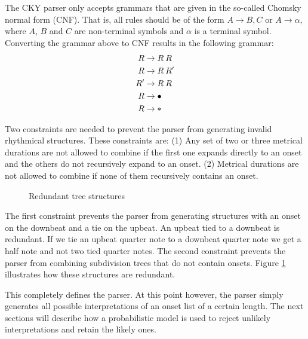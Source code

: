 The CKY parser only accepts grammars that are given in the so-called Chomsky normal form (CNF). That is, all rules should be of the form $A \rightarrow B, C$ or $A \rightarrow \alpha$, where $A$, $B$ and $C$ are non-terminal symbols and $\alpha$ is a terminal symbol. Converting the grammar above to CNF results in the following grammar:
\begin{align}
\label{eq:grammar_cnf}
R &\rightarrow R\: R\\ \notag
R &\rightarrow R\: R'\\ \notag
R' &\rightarrow R\: R\\ \notag
R &\rightarrow \bullet\\ \notag
R &\rightarrow * \notag
\end{align}

Two constraints are needed to prevent the parser from generating invalid rhythmical structures. These constraints are: (1) Any set of two or three metrical durations are not allowed to combine if the first one expands directly to an onset and the others do not recursively expand to an onset. (2) Metrical durations are not allowed to combine if none of them recursively contains an onset.

\begin{figure}
\centering
{}
\qquad
{}
\caption{Redundant tree structures}
\label{fig:constraints}
\end{figure}

The first constraint prevents the parser from generating structures with an onset on the downbeat and a tie on the upbeat. An upbeat tied to a downbeat is redundant. If we tie an upbeat quarter note to a downbeat quarter note we get a half note and not two tied quarter notes. The second constraint prevents the parser from combining subdivision trees that do not contain onsets. Figure \ref{fig:constraints} illustrates how these structures are redundant.


This completely defines the parser. At this point however, the parser simply generates all possible interpretations of an onset list of a certain length. The next sections will describe how a probabilistic model is used to reject unlikely interpretations and retain the likely ones.

